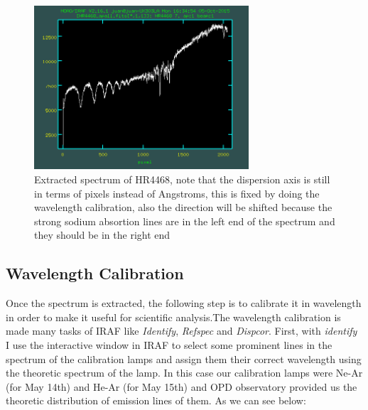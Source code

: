 \begin{figure}[H]
\centering
\includegraphics[width=8cm]{images/calib_star_apall.png}
\caption{Extracted spectrum of HR4468, note that the dispersion axis is still in terms of pixels instead of Angstroms, this is fixed by doing the wavelength calibration, also the direction will be shifted because the strong sodium absortion lines are in the left end of the spectrum and they should be in the right end}
\end{figure}

\subsection{Wavelength Calibration}

Once the spectrum is extracted, the following step is to calibrate it in wavelength in order to make it useful for scientific analysis.The wavelength calibration is made many tasks of IRAF like \textit{Identify}, \textit{Refspec} and \textit{Dispcor}. First, with \textit{identify} I use the interactive window in IRAF to select some prominent lines in the spectrum of the calibration lamps and assign them their correct wavelength using the theoretic spectrum of the lamp. In this case our calibration lamps were Ne-Ar (for May 14th) and He-Ar (for May 15th)  and OPD observatory provided us the theoretic distribution of emission lines of them. As we can see below:


